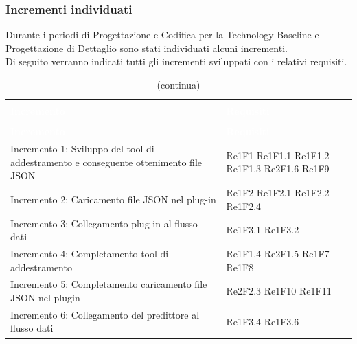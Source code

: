 \pagebreak
\subsubsection{Incrementi individuati}
Durante i periodi di Progettazione e Codifica per la Technology Baseline e Progettazione di Dettaglio sono stati individuati alcuni incrementi. \\
Di seguito verranno indicati tutti gli incrementi sviluppati con i relativi requisiti.

\begin{longtable}{C{4cm} L{3cm}}
\caption{Tracciamento incrementi} \\
\textcolor{white}{\textbf{Incremento}} &
\textcolor{white}{\textbf{Requisiti}} \\
		\endfirsthead
		\caption[]{(continua)} \\
\textcolor{white}{\textbf{Incremento}} &
\textcolor{white}{\textbf{Requisiti}} \\
		\endhead
Incremento 1: Sviluppo del tool di addestramento e conseguente ottenimento file JSON & Re1F1 \newline Re1F1.1  \newline Re1F1.2 \newline Re1F1.3 \newline Re2F1.6 \newline Re1F9 \\
Incremento 2: Caricamento file JSON	nel plug-in & Re1F2 \newline Re1F2.1 \newline Re1F2.2  \newline Re1F2.4\\
Incremento 3: Collegamento plug-in al flusso dati & Re1F3.1 \newline Re1F3.2
\\
Incremento 4: Completamento tool di addestramento & Re1F1.4 \newline Re2F1.5 \newline Re1F7 \newline Re1F8 
\\
Incremento 5: Completamento caricamento file JSON nel plugin & Re2F2.3 \newline Re1F10 \newline Re1F11
\\
Incremento 6: Collegamento del predittore al flusso dati & Re1F3.4 \newline Re1F3.6
\\

\end{longtable}
